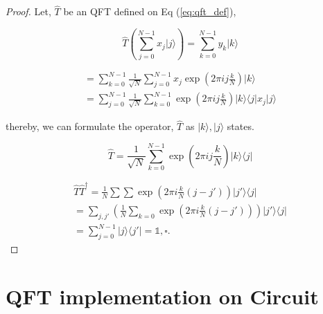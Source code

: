 \begin{proof}
Let, $\hat{T}$ be an QFT defined on Eq (\ref{eq:qft_def}),

\begin{equation}
    \hat{T}\left( \sum_{j=0}^{N-1} x_j | j \rangle \right) = \sum_{k=0}^{N-1} y_k | k \rangle
\end{equation}

\begin{align}
    = \sum_{k=0}^{N-1} \frac{1}{\sqrt{N}} \sum_{j=0}^{N-1} x_j \exp\left(2 \pi i j \frac{k}{N} \right) | k \rangle \\
    = \sum_{j=0}^{N-1} \frac{1}{\sqrt{N}} \sum_{k=0}^{N-1} \exp\left(2 \pi i j \frac{k}{N} \right) | k \rangle \langle j| x_j | j \rangle
\end{align}

thereby, we can formulate the operator, $\hat{T}$ as $|k\rangle, |j \rangle$ states.

\begin{equation}
    \hat{T} = \frac{1}{\sqrt{N}} \sum_{k=0}^{N-1} \exp\left(2 \pi i j \frac{k}{N} \right) | k \rangle \langle j|
\end{equation}


\begin{align}
    \hat{T} \hat{T}^\dagger  = \frac{1}{N} \sum \sum \exp\left(2 \pi i \frac{k}{N} (j - j') \right) |j' \rangle \langle j |\\
    = \sum_{j, j'} \left( \frac{1}{N} \sum_{k=0} \exp(2 \pi i \frac{k}{N} ( j- j') ) \right) |j' \rangle \langle j|\\
    = \sum_{j=0}^{N-1} | j \rangle \langle j' |  = \mathds{1}, \square \text{.}
\end{align}

\end{proof}

\section{QFT implementation on Circuit}
